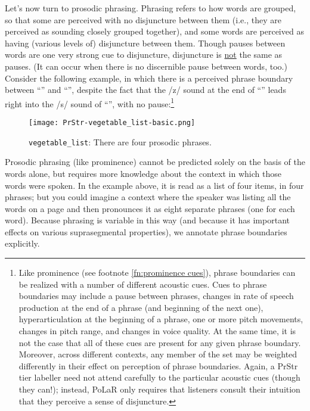 Let’s now turn to prosodic phrasing. Phrasing refers to how words are grouped, so that some are perceived with no disjuncture between them (i.e., they are perceived as sounding closely grouped together), and some words are perceived as having (various levels of) disjuncture between them. Though pauses between words are one very strong cue to disjuncture, disjuncture is \uline{not} the same as pauses. (It can occur when there is no discernible pause between words, too.) Consider the following example, in which there is a perceived phrase boundary between “” and “”, despite the fact that the /z/ sound at the end of “” leads right into the /s/ sound of “”, with no pause:\footnote{Like prominence (see footnote \ref{fn:prominence cues}), phrase boundaries can be realized with a number of different acoustic cues. Cues to phrase boundaries may include a pause between phrases, changes in rate of speech production at the end of a phrase (and beginning of the next one), hyperarticulation at the beginning of a phrase, one or more pitch movements, changes in pitch range, and changes in voice quality. At the same time, it is not the case that all of these cues are present for any given phrase boundary. Moreover, across different contexts, any member of the set may be weighted differently in their effect on perception of phrase boundaries. Again, a PrStr tier labeller need not attend carefully to the particular acoustic cues (though they can!); instead, PoLaR only requires that listeners consult their intuition that they perceive a sense of disjuncture.\label{fn:phrasing cues}}

\begin{figure}[H]
\centering
%
\texttt{[image: PrStr-vegetable\_list-basic.png]}
%
\caption{\texttt{vegetable\_list}: There are four prosodic phrases.%
\label{fig:vegetable list phrases}%
%
}
\end{figure}

Prosodic phrasing (like prominence) cannot be predicted solely on the basis of the words alone, but requires more knowledge about the context in which those words were spoken. In the example above, it is read as a list of four items, in four phrases; but you could imagine a context where the speaker was listing all the words on a page and then pronounces it as eight separate phrases (one for each word). Because phrasing is variable in this way (and because it has important effects on various suprasegmental properties), we annotate phrase boundaries explicitly.

